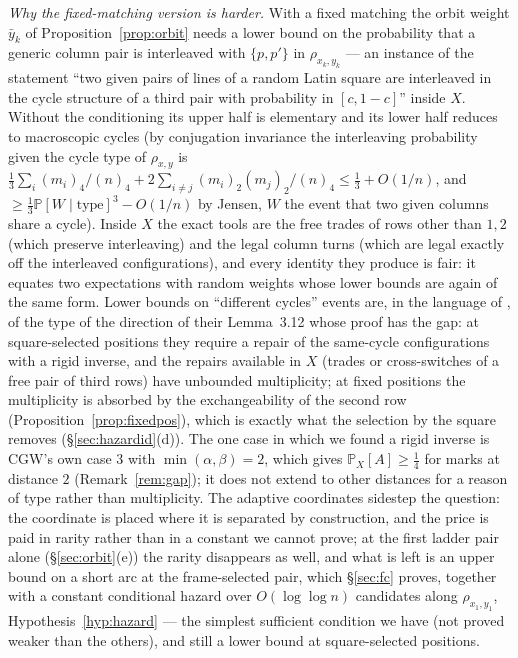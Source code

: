 \documentclass[11pt]{article}
\theoremstyle{definition}
\renewcommand{\Pr}{\mathbb{P}}
\begin{document}
\emph{Why the fixed-matching version is harder.}  With a fixed matching the orbit weight
$\bar y_k$ of Proposition~\ref{prop:orbit} needs a lower bound on the probability that a
generic column pair is interleaved with $\{p,p'\}$ in $\rho_{x_k,y_k}$ --- an instance of
the statement ``two given pairs of lines of a random Latin square are interleaved in the
cycle structure of a third pair with probability in $[c,1-c]$'' inside $X$.  Without the
conditioning its upper half is elementary and its lower half reduces to macroscopic cycles
(by conjugation invariance the interleaving probability given the cycle type of $\rho_{x,y}$
is $\tfrac13\sum_i(m_i)_4/(n)_4+2\sum_{i\ne j}(m_i)_2(m_j)_2/(n)_4\le\tfrac13+O(1/n)$, and
$\ge\tfrac13\Pr[W\mid\text{type}]^3-O(1/n)$ by Jensen, $W$ the event that two given columns
share a cycle).  Inside $X$ the exact tools are the free trades of rows other than $1,2$
(which preserve interleaving) and the legal column turns (which are legal exactly off the
interleaved configurations), and every identity they produce is fair: it equates two
expectations with random weights whose lower bounds are again of the same form.  Lower
bounds on ``different cycles'' events are, in the language of \cite{CGW08}, of the type of
the direction of their Lemma~3.12 whose proof has the gap: at square-selected positions
they require a repair of the same-cycle configurations with a rigid inverse, and the
repairs available in $X$ (trades or cross-switches of a free pair of third rows) have
unbounded multiplicity; at fixed positions the multiplicity is absorbed by the
exchangeability of the second row (Proposition~\ref{prop:fixedpos}), which is exactly what
the selection by the square removes (\S\ref{sec:hazardid}(d)).  The one case in
which we found a rigid inverse is CGW's own case 3 with $\min(\alpha,\beta)=2$, which gives
$\Pr_X[A]\ge\tfrac14$ for marks at distance $2$ (Remark~\ref{rem:gap}); it does not extend
to other distances for a reason of type rather than multiplicity.  The adaptive
coordinates sidestep the question: the coordinate is placed where it is separated by
construction, and the price is paid in rarity rather than in a constant we cannot prove;
at the first ladder pair alone (\S\ref{sec:orbit}(e)) the rarity disappears as well, and
what is left is an upper bound on a short arc at the frame-selected pair, which
\S\ref{sec:fc} proves, together with a constant conditional hazard over $O(\log\log n)$
candidates along $\rho_{x_1,y_1}$, Hypothesis~\ref{hyp:hazard} --- the simplest sufficient
condition we have (not proved weaker than the others), and still a lower bound at
square-selected positions.
\end{document}
